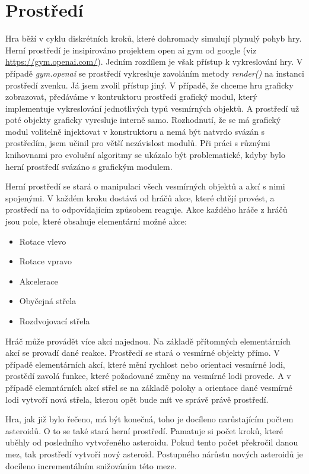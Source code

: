 \newpage



\section{Prostředí}

Hra běží v cyklu diskrétních kroků, které dohromady simulují plynulý pohyb hry.
Herní prostředí je insipirováno projektem open ai gym od google
(viz \url{https://gym.openai.com/}). Jedním rozdílem je však přístup k vykreslování hry. V případě \emph{gym.openai} se prostředí vykresluje zavoláním metody \emph{render()} na instanci prostředí zvenku.
Já jsem zvolil přístup jiný. V případě, že chceme hru graficky zobrazovat, předáváme v kontruktoru prostředí grafický modul, který implementuje vykreslování jednotlivých typů vesmírných objektů.
A prostředí už poté objekty graficky vyresluje interně samo. Rozhodnutí, že se má grafický modul volitelně injektovat v konstruktoru a nemá být natvrdo svázán s prostředím, jsem učinil pro větší nezávislost modulů. 
Při práci s různými knihovnami pro evoluční algoritmy se ukázalo být problematické, kdyby bylo herní prostředí svázáno s grafickým modulem.
\par

Herní prostředí se stará o manipulaci všech vesmírných objektů a akcí s nimi spojenými. 
V každém kroku dostává od hráčů akce, které chtějí provést, a prostředí na to odpovídajícím způsobem reaguje. 
Akce každého hráče z hráčů jsou pole, které obsahuje elementární možné akce:
\begin{itemize}
    \item Rotace vlevo
    \item Rotace vpravo
    \item Akcelerace
    \item Obyčejná střela
    \item Rozdvojovací střela
\end{itemize} 
Hráč může provádět více akcí najednou. Na základě přítomných elementárních akcí se provadí dané reakce.
Prostředí se stará o vesmírné objekty přímo. V případě elementárních akcí, které mění rychlost nebo orientaci vesmírné lodi, prostědí zavolá funkce, které požadované změny na vesmírné lodi provede.
A v případě elemntárních akcí střel se na základě polohy a orientace dané vesmírné lodi vytvoří nová střela, kterou opět bude mít ve správě právě prostředí.

\par
Hra, jak již bylo řečeno, má být konečná, toho je docíleno narůstajícím počtem asteroidů. O to se také stará herní prostředí.
Pamatuje si počet kroků, které uběhly od posledního vytvořeného asteroidu. Pokud tento počet překročil danou mez, tak prostředí vytvoří nový asteroid.
Postupného nárůstu nových asteroidů je docíleno incrementálním snižováním této meze.

